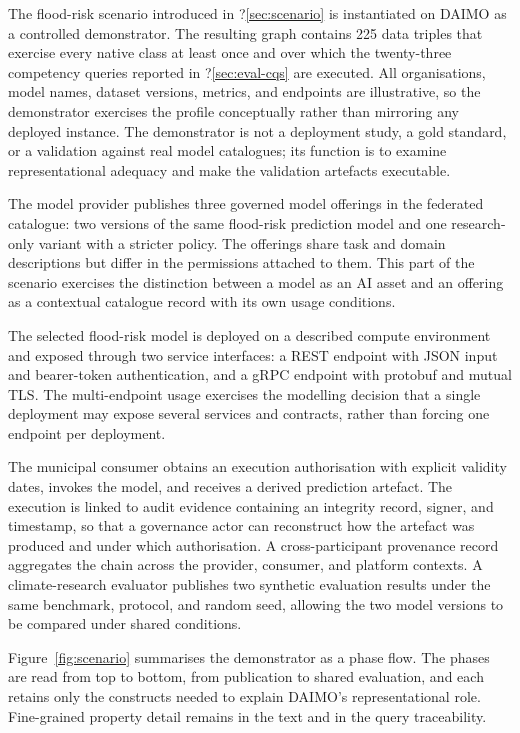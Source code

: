 \documentclass[Afour,sagev,times]{sagej}
\begin{document}
The flood-risk scenario introduced in ?\ref{sec:scenario} is instantiated on DAIMO as a controlled demonstrator. The resulting graph contains 225 data triples that exercise every native class at least once and over which the twenty-three competency queries reported in ?\ref{sec:eval-cqs} are executed. All organisations, model names, dataset versions, metrics, and endpoints are illustrative, so the demonstrator exercises the profile conceptually rather than mirroring any deployed instance. The demonstrator is not a deployment study, a gold standard, or a validation against real model catalogues; its function is to examine representational adequacy and make the validation artefacts executable.

The model provider publishes three governed model offerings in the federated catalogue: two versions of the same flood-risk prediction model and one research-only variant with a stricter policy. The offerings share task and domain descriptions but differ in the permissions attached to them. This part of the scenario exercises the distinction between a model as an AI asset and an offering as a contextual catalogue record with its own usage conditions.

The selected flood-risk model is deployed on a described compute environment and exposed through two service interfaces: a REST endpoint with JSON input and bearer-token authentication, and a gRPC endpoint with protobuf and mutual TLS. The multi-endpoint usage exercises the modelling decision that a single deployment may expose several services and contracts, rather than forcing one endpoint per deployment.

The municipal consumer obtains an execution authorisation with explicit validity dates, invokes the model, and receives a derived prediction artefact. The execution is linked to audit evidence containing an integrity record, signer, and timestamp, so that a governance actor can reconstruct how the artefact was produced and under which authorisation. A cross-participant provenance record aggregates the chain across the provider, consumer, and platform contexts. A climate-research evaluator publishes two synthetic evaluation results under the same benchmark, protocol, and random seed, allowing the two model versions to be compared under shared conditions.

Figure~\ref{fig:scenario} summarises the demonstrator as a phase flow. The phases are read from top to bottom, from publication to shared evaluation, and each retains only the constructs needed to explain DAIMO's representational role. Fine-grained property detail remains in the text and in the query traceability.
\end{document}
